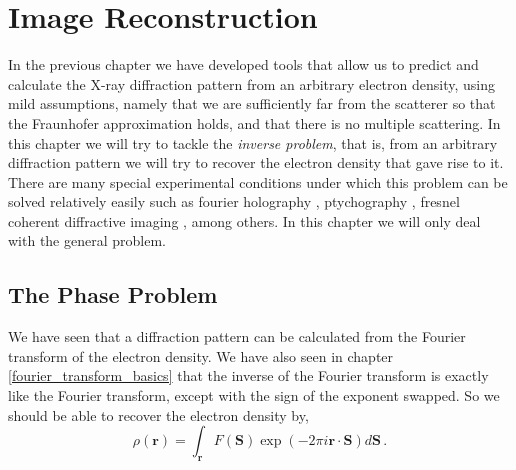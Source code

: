 \chapter{Image Reconstruction}\label{Image Reconstruction}\noindent

In the previous chapter we have developed tools that allow us to predict
and calculate the X-ray diffraction pattern from an arbitrary electron density,
using mild assumptions, namely that we are sufficiently far from the scatterer so
that the Fraunhofer approximation holds, and that there is no multiple
scattering.
In this chapter we will try to tackle the {\em inverse
  problem}, that is, from an arbitrary diffraction pattern we will try to
recover the electron density that gave rise to it. There are many 
special experimental conditions under which this problem can be solved
relatively easily such as fourier holography
\cite{McNulty1992Highresolution,Eisebitt2004Lensless,Marchesini2008Massively},
ptychography \cite{Rodenburg2007Transmission,Thibault2009Probe}, fresnel coherent
diffractive imaging \cite{Quiney2006Diffractive,Quiney2005Iterative}, among others. In this chapter we will only deal with
the general problem. 
\section{The Phase Problem}

We have seen that a diffraction pattern can be calculated from the Fourier
transform of the electron density. We have also seen in chapter
\ref{fourier_transform_basics} that the inverse of the Fourier transform is
exactly like the Fourier transform, except with the sign of the exponent
swapped. So we should be able to recover the electron density by,
\begin{equation}
\rho(\mathbf r) = \int_{\mathbf r} F(\mathbf S) \exp\left(-2
    \pi i \mathbf r \cdot \mathbf S \right) d\mathbf S\, .
\end{equation}

